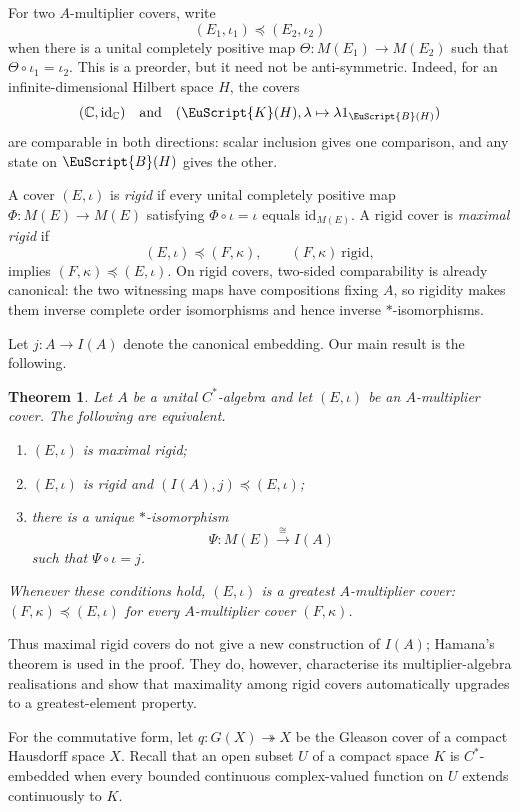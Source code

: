 \documentclass[11pt,a4paper]{amsart}
\numberwithin{equation}{section}
\theoremstyle{paperplain}
\newtheorem{theorem}{Theorem}
\theoremstyle{remark}
\newcommand{\Id}{\mathrm{id}}
\newcommand{\K}{\EuScript{K}}
\newcommand{\B}{\EuScript{B}}
\begin{document}
For two $A$-multiplier covers, write
\[
(E_1,\iota_1)\preccurlyeq(E_2,\iota_2)
\]
when there is a unital completely positive map $\Theta\colon M(E_1)\to M(E_2)$ such that $\Theta\circ\iota_1=\iota_2$. This is a preorder, but it need not be anti-symmetric. Indeed, for an infinite-dimensional Hilbert space $H$, the covers
\[
(\mathbb C,\Id_{\mathbb C})
\quad\text{and}\quad
(\K(H),\lambda\mapsto\lambda 1_{\B(H)})
\]
are comparable in both directions: scalar inclusion gives one comparison, and any state on $\B(H)$ gives the other.

A cover $(E,\iota)$ is \emph{rigid} if every unital completely positive map $\Phi\colon M(E)\to M(E)$ satisfying $\Phi\circ\iota=\iota$ equals $\Id_{M(E)}$. A rigid cover is \emph{maximal rigid} if
\[
(E,\iota)\preccurlyeq(F,\kappa),\qquad (F,\kappa)\ \text{rigid},
\]
implies $(F,\kappa)\preccurlyeq(E,\iota)$. On rigid covers, two-sided comparability is already canonical: the two witnessing maps have compositions fixing $A$, so rigidity makes them inverse complete order isomorphisms and hence inverse $*$-isomorphisms.

Let $j\colon A\to I(A)$ denote the canonical embedding. Our main result is the following.

\begin{theorem}\label{thm:A}
Let $A$ be a unital $C^*$-algebra and let $(E,\iota)$ be an $A$-multiplier cover. The following are equivalent.
\begin{enumerate}[label=\textup{(\roman*)},leftmargin=2.5em]
\item $(E,\iota)$ is maximal rigid;
\item $(E,\iota)$ is rigid and $(I(A),j)\preccurlyeq(E,\iota)$;
\item there is a unique $*$-isomorphism
\[
\Psi\colon M(E)\xrightarrow{\ \cong\ }I(A)
\]
such that $\Psi\circ\iota=j$.
\end{enumerate}
Whenever these conditions hold, $(E,\iota)$ is a greatest $A$-multiplier cover: $(F,\kappa)\preccurlyeq(E,\iota)$ for every $A$-multiplier cover $(F,\kappa)$.
\end{theorem}

Thus maximal rigid covers do not give a new construction of $I(A)$; Hamana's theorem is used in the proof. They do, however, characterise its multiplier-algebra realisations and show that maximality among rigid covers automatically upgrades to a greatest-element property.

For the commutative form, let $q\colon G(X)\twoheadrightarrow X$ be the Gleason cover of a compact Hausdorff space $X$. Recall that an open subset $U$ of a compact space $K$ is $C^*$-embedded when every bounded continuous complex-valued function on $U$ extends continuously to $K$.
\end{document}
